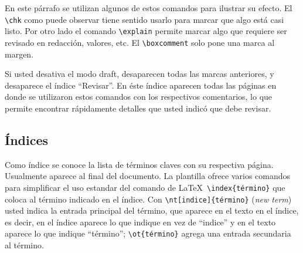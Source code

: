 En este párrafo se utilizan algunos de estos comandos
para ilustrar su efecto.  El \verb+\chk+ como puede observar tiene sentido
usarlo para marcar que algo está casi listo.  Por otro lado 
el comando \verb+\explain+ permite marcar algo que requiere ser revisado en
redacción, valores, etc.  El \verb+\boxcomment+
solo pone una marca al margen.


Si usted desativa el modo draft, desaparecen todas las marcas
anteriores, y desaparece el índice ``Revisar''.  En éste índice
aparecen todas las páginas en donde se utilizaron estos comandos con
los respectivos comentarios, lo que permite encontrar rápidamente
detalles que usted indicó que debe revisar.

\subsection{Índices}

Como índice se conoce la lista de términos claves con su respectiva
página.  Usualmente aparece al final del documento.  La plantilla
ofrece varios comandos para simplificar el uso estandar del comando de
\LaTeX\ \verb+\index{término}+ que coloca al término indicado en el
índice.  Con \verb+\nt[indice]{término}+ (\emph{new term}) usted
indica la entrada principal del término, que aparece en el texto en el
índice, es decir, en el índice aparece lo que indique en vez de
``indice'' y en el texto aparece lo que indique ``término'';
\verb+\ot{término}+ agrega una entrada secundaria al término.
